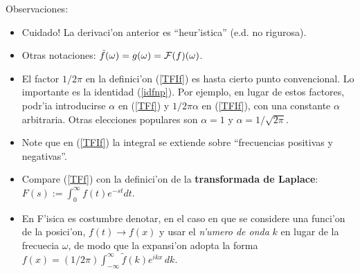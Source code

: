 Observaciones:

\begin{itemize}
\item Cuidado! La derivaci'on anterior es ``heur'istica'' (e.d. no rigurosa). 
\item Otras notaciones: $\tilde{f}(\omega)=g(\omega)={\cal F}(f)(\omega)$.
\item El factor $1/2\pi$ en la definici'on (\ref{TFIf}) es hasta cierto punto convencional. Lo importante es la identidad (\ref{idfnp}). Por ejemplo, en lugar de estos factores, podr'ia introducirse $\alpha$ en (\ref{TFf}) y $1/2\pi\alpha$ en (\ref{TFIf}), con una constante $\alpha$ arbitraria. Otras elecciones populares son $\alpha=1$ y $\alpha=1/\sqrt{2\pi}$.
\item Note que en (\ref{TFIf}) la integral se extiende sobre ``frecuencias positivas y negativas''.
\item Compare (\ref{TFf}) con la definici'on de la \textbf{transformada de Laplace}: $F(s):=\int_0^\infty f(t)e^{-st}dt$.
\item En F'isica es costumbre denotar, en el caso en que se considere una funci'on de la posici'on, $f(t)\to f(x)$ y usar el \textit{n'umero de onda} $k$ en lugar de la frecuecia $\omega$, de modo que la expansi'on adopta la forma $f(x)=(1/{2\pi})\int_{-\infty}^\infty\tilde{f}(k) e^{ikx} \,dk.$
\end{itemize}

